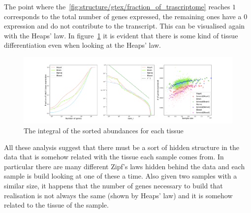 The point where the~\ref{fig:structure/gtex/fraction_of_trascriptome} reaches $1$ corresponds to the total number of genes expressed, the remaining ones have a $0$ expression and do not contribute to the transcript. This can be visualised again with the Heaps' law. In figure~\ref{fig:structure/gtex/heaps_tissue} it is evident that there is some kind of tissue differentiation even when looking at the Heaps' law.
\begin{figure}[htb!]
  \centering
  \includegraphics[width=0.6\linewidth]{pictures/structure/gtex/heaps_tissue.pdf}
  \caption{The integral of the sorted abundances for each tissue}
  \label{fig:structure/gtex/heaps_tissue}
\end{figure}

All these analysis suggest that there must be a sort of hidden structure in the data that is somehow related with the tissue each sample comes from. In particular there are many different Zipf's laws hidden behind the data and each sample is build looking at one of these a time. Also given two samples with a similar size, it happens that the number of genes necessary to build that realisation is not always the same (shown by Heaps' law) and it is somehow related to the tissue of the sample.

